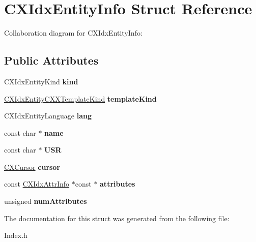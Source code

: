 \hypertarget{structCXIdxEntityInfo}{}\section{C\+X\+Idx\+Entity\+Info Struct Reference}
\label{structCXIdxEntityInfo}


Collaboration diagram for C\+X\+Idx\+Entity\+Info\+:
\subsection*{Public Attributes}
\begin{DoxyCompactItemize}
\item 
\mbox{\label{structCXIdxEntityInfo_a7e62dd3be28609af350dbc0f530e5a97}} 
C\+X\+Idx\+Entity\+Kind {\bfseries kind}
\item 
\mbox{\label{structCXIdxEntityInfo_aca7b25befc44d53c38630136eb86a2a7}} 
\hyperlink{group__CINDEX__HIGH_gaffb304a99b36f147738b3349e7aa22cb}{C\+X\+Idx\+Entity\+C\+X\+X\+Template\+Kind} {\bfseries template\+Kind}
\item 
\mbox{\label{structCXIdxEntityInfo_adfa8414550b76d6f0a3b14ec03121022}} 
C\+X\+Idx\+Entity\+Language {\bfseries lang}
\item 
\mbox{\label{structCXIdxEntityInfo_a72dc7b0750367104a1a98433c31be92d}} 
const char $\ast$ {\bfseries name}
\item 
\mbox{\label{structCXIdxEntityInfo_a4c5d686849d9ba9f8020bc0b9a65416f}} 
const char $\ast$ {\bfseries U\+SR}
\item 
\mbox{\label{structCXIdxEntityInfo_ab9951c6678c5efac6577a0eb851ad4b5}} 
\hyperlink{structCXCursor}{C\+X\+Cursor} {\bfseries cursor}
\item 
\mbox{\label{structCXIdxEntityInfo_af0634388d35f36aab8ef6f8187c56860}} 
const \hyperlink{structCXIdxAttrInfo}{C\+X\+Idx\+Attr\+Info} $\ast$const  $\ast$ {\bfseries attributes}
\item 
\mbox{\label{structCXIdxEntityInfo_aee5ba7574362fce864d73840451e4f75}} 
unsigned {\bfseries num\+Attributes}
\end{DoxyCompactItemize}


The documentation for this struct was generated from the following file\+:\begin{DoxyCompactItemize}
\item 
Index.\+h\end{DoxyCompactItemize}
